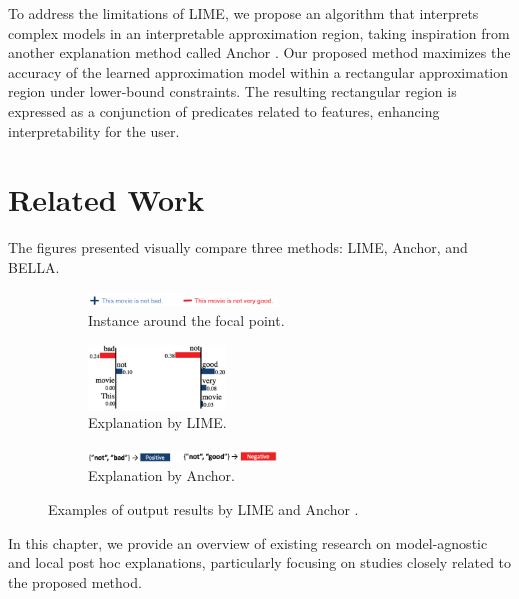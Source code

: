 \documentclass[runningheads]{llncs}
\begin{document}
To address the limitations of LIME,
we propose an algorithm that interprets complex models
in an interpretable approximation region,
taking inspiration from another explanation method called Anchor
\cite{ribeiro2018anchors}.
Our proposed method maximizes the accuracy of the learned approximation model
within a rectangular approximation region under lower-bound constraints.
The resulting rectangular region is expressed as a conjunction of predicates
related to features, enhancing interpretability for the user.

\section{Related Work}
The figures presented visually compare three methods: LIME, Anchor, and BELLA.

\begin{figure}[t]
  \vspace{0.5cm}
  \begin{subfigure}[t]{\textwidth}
    \centering
    \includegraphics[width=0.55\textwidth]{lime_vs_anchor_exp_a.png}
    \caption{Instance around the focal point.}\label{fig:lime_vs_anchor_exp_a}
    \vspace{0.5cm}
  \end{subfigure}
  \hfill
  \begin{subfigure}[t]{\textwidth}
    \centering
    \includegraphics[width=0.4\textwidth]{lime_vs_anchor_exp_b.png}
    \caption{Explanation by LIME.}\label{fig:lime_vs_anchor_exp_b}
    \vspace{0.5cm}
  \end{subfigure}
  \begin{subfigure}[t]{\textwidth}
    \centering
    \includegraphics[width=0.55\textwidth]{lime_vs_anchor_exp_c.png}
    \caption{Explanation by Anchor.}\label{fig:lime_vs_anchor_exp_c}
  \end{subfigure}
  \caption[Examples of output results by LIME and Anchor]{Examples of output results by LIME and Anchor \cite{ribeiro2018anchors}.}\label{fig:lime_vs_anchor_exp}
\end{figure}
In this chapter, we provide an overview of existing research on model-agnostic and local post hoc explanations, particularly focusing on studies closely related to the proposed method.
\end{document}
